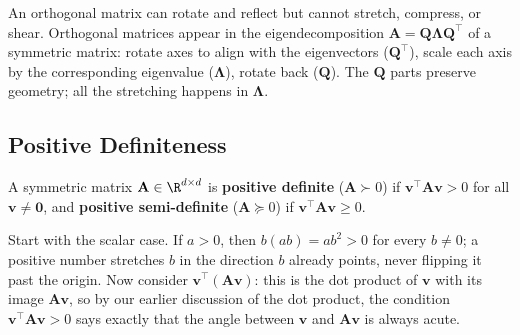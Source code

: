 \documentclass[main.tex]{subfiles}
\begin{document}
An orthogonal matrix can rotate and reflect but cannot stretch, compress, or shear. Orthogonal matrices appear in the eigendecomposition $\mathbf{A} = \mathbf{Q}\boldsymbol{\Lambda}\mathbf{Q}^\top$ of a symmetric matrix: rotate axes to align with the eigenvectors ($\mathbf{Q}^\top$), scale each axis by the corresponding eigenvalue ($\boldsymbol{\Lambda}$), rotate back ($\mathbf{Q}$). The $\mathbf{Q}$ parts preserve geometry; all the stretching happens in $\boldsymbol{\Lambda}$.

\subsection{Positive Definiteness}

A symmetric matrix $\mathbf{A} \in \R^{d \times d}$ is \textbf{positive definite} ($\mathbf{A} \succ 0$) if $\mathbf{v}^\top\mathbf{A}\mathbf{v} > 0$ for all $\mathbf{v} \neq \mathbf{0}$, and \textbf{positive semi-definite} ($\mathbf{A} \succeq 0$) if $\mathbf{v}^\top\mathbf{A}\mathbf{v} \geq 0$.

Start with the scalar case. If $a > 0$, then $b(ab) = a b^2 > 0$ for every $b \neq 0$; a positive number stretches $b$ in the direction $b$ already points, never flipping it past the origin. Now consider $\mathbf{v}^\top(\mathbf{A}\mathbf{v})$: this is the dot product of $\mathbf{v}$ with its image $\mathbf{A}\mathbf{v}$, so by our earlier discussion of the dot product, the condition $\mathbf{v}^\top\mathbf{A}\mathbf{v} > 0$ says exactly that the angle between $\mathbf{v}$ and $\mathbf{A}\mathbf{v}$ is always acute.

\begin{center}
\end{center}
\end{document}
